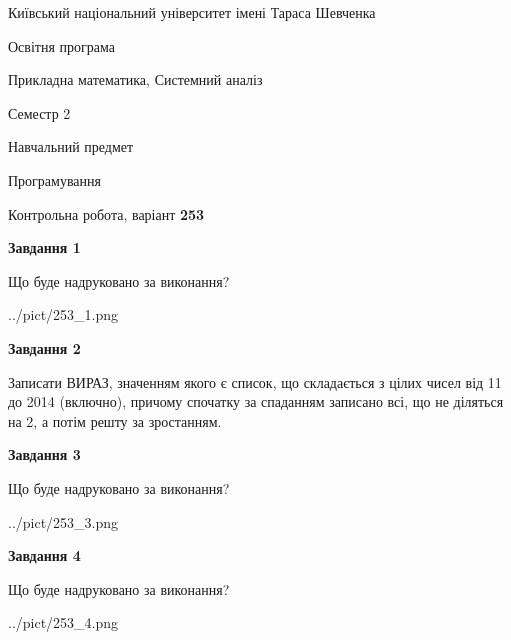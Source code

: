 \documentclass[12pt, ukrainian]{article}
\begin{document}
{{\begin {small}\par
{ \center  Київський національний університет імені Тараса Шевченка \par}
{\parbox {5 cm}{Освітня програма \hfill}{\parbox {8 cm}{Прикладна математика, Системний аналіз \hfill}}\parbox {5 cm}{\hfill Семестр 2}}\par
{\parbox {5 cm} {Навчальний предмет \hfill}\parbox {7 cm}{Програмування \hfill}\parbox {6cm}{\hfill}\par}\vspace{-7pt} \end{small}}{\center Контрольна робота, варіант  \No \textbf
{ 253 }\par}}
{
\begin {large}
{\begin {center}\textbf{Завдання 1}\end {center}}\par
Що буде надруковано за виконання?\par\par
\begin{center}
	{../pict/253_1.png}
\end{center}
\newpage

{\begin {center}\textbf{Завдання 2}\end {center}}\par

Записати ВИРАЗ, значенням якого є список, що складається з цілих чисел від 11 до 2014 (включно), причому спочатку за спаданням записано всі, що не діляться на 2, а потім решту за зростанням.\par
\newpage

{\begin {center}\textbf{Завдання 3}\end {center}}\par
Що буде надруковано за виконання?\par
\begin{center}
	{../pict/253_3.png}
\end{center}
\newpage

{\begin {center}\textbf{Завдання 4}\end {center}}\par
Що буде надруковано за виконання?\par
\begin{center}
	{../pict/253_4.png}
\end{center}
\newpage


\end{large}}
\end{document}

